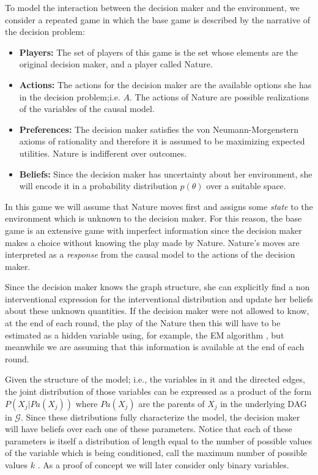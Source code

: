 \documentclass{article}
\begin{document}
To model the interaction between the decision maker and the environment, we consider a repeated game in which the base game is described by the narrative of the decision problem: 
\begin{itemize}
\item \textbf{Players:} The set of players of this game is the set whose elements are the original decision maker, and a player called Nature.
\item \textbf{Actions:} The actions for the decision maker are the available options she has in the decision problem;i.e. $A$. The actions of Nature are possible realizations of the variables of the causal model. 
\item \textbf{Preferences:} The decision maker satisfies the von Neumann-Morgenstern axioms of rationality and therefore it is assumed to be maximizing expected utilities. Nature is indifferent over outcomes.
\item \textbf{Beliefs:} Since the decision maker has uncertainty about her environment, she will encode it in a probability distribution $p(\theta)$ over a suitable space.
\end{itemize}

In this game we will assume that Nature moves first and assigns some \textit{state} to the environment which is unknown to the decision maker. For this reason, the base game is an extensive game with imperfect information since the decision maker makes a choice without knowing the play made by Nature. Nature's moves are interpreted as a \textit{response} from the causal model to the actions of the decision maker.

Since the decision maker knows the graph structure, she can explicitly find a non interventional expression for the interventional distribution and update her beliefs about these unknown quantities. If the decision maker were not allowed to know, at the end of each round, the play of the Nature then this will have to be estimated as a hidden variable using, for example, the EM algorithm \cite{dempster1977maximum}, but meanwhile we are assuming that this information is available at the end of each round.

Given the structure of the model; i.e., the variables in it and the directed edges, the joint distribution of those variables can be expressed as a product of the form $P(X_j | Pa(X_j))$ where $Pa(X_j)$ are the parents of $X_j$ in the underlying DAG in $\mathcal{G}$. Since these distributions fully characterize the model, the decision maker will have beliefs over each one of these parameters. Notice that each of these parameters is itself a distribution of length equal to the number of possible values of the variable which is being conditioned, call the maximum number of possible values $k$ . As a proof of concept we will later consider only binary variables.
\end{document}

